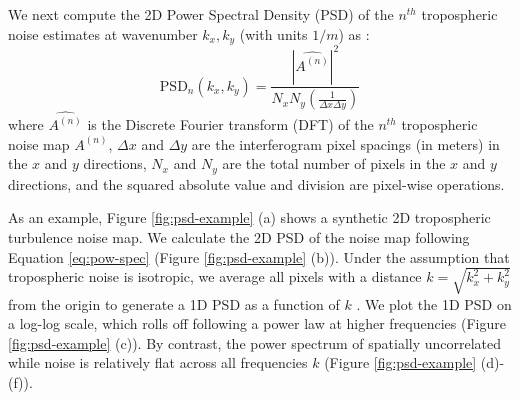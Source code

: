 We next compute the 2D Power Spectral Density (PSD) of the $n^{th}$ tropospheric noise estimates at  wavenumber $ k_x, k_y $ (with units $1/m$) as \citep{Jacobs2017QuantitativeCharacterizationSurface}:
\begin{equation}
	\text{PSD}_n(k_x, k_y) = \frac{| \widehat{A^{(n)}} |^2 }{N_x N_y (\frac{1}{\Delta x \Delta y}) } \label{eq:pow-spec}
\end{equation}
where  $\widehat{A^{(n)}}$ is the Discrete Fourier transform (DFT) of  the $n^{th}$ tropospheric noise map $A^{(n)}$, $\Delta x$ and $\Delta y$ are the interferogram pixel spacings (in meters) in the $x$ and $y$ directions, $N_x$ and $N_y$ are the total number of pixels in the $x$ and $y$ directions, and the squared absolute value and division are pixel-wise operations. 


As an example, Figure \ref{fig:psd-example} (a) shows a synthetic 2D tropospheric turbulence noise map. We calculate the 2D PSD of the noise map following Equation \eqref{eq:pow-spec} (Figure \ref{fig:psd-example} (b)). Under the assumption that tropospheric noise is isotropic, we average all pixels with a distance  $k= \sqrt{k_x^2 + k_y^2}$ from the origin to generate a 1D PSD as a function of $k$ \citep{Hanssen2001RadarInterferometryData}.
We plot the 1D PSD on a log-log scale, which rolls off following a power law at higher frequencies (Figure \ref{fig:psd-example} (c)). By contrast, the power spectrum of spatially uncorrelated while noise is relatively flat across all frequencies $k$ (Figure \ref{fig:psd-example} (d)-(f)).


